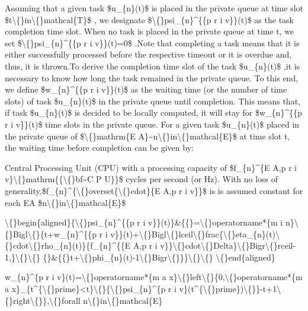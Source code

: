 \documentclass{article}
\begin{document}
Assuming that a given task \$u\_\{n\}(t)\$ is placed in the private queue at time slot \$t\textbackslash\{\}in\textbackslash\{\}mathcal\{T\}\$ , we designate \$\textbackslash\{\}psi\_\{n\}\textasciicircum{}\{\{p r i v\}\}(t)\$ as the task completion time slot. When no task is placed in the private queue at time t, we set \$\textbackslash\{\}psi\_\{n\}\textasciicircum{}\{\{p r i v\}\}(t)=0\$ .Note that completing a task means that it is either successfully processed before the respective timeout or it is overdue and, thus, it is thrown.To derive the completion time slot of the task \$u\_\{n\}(t)\$ ,it is necessary to know how long the task remained in the private queue. To this end, we define \$w\_\{n\}\textasciicircum{}\{\{p r i v\}\}(t)\$ as the waiting time (or the number of time slots) of task \$u\_\{n\}(t)\$ in the private queue until completion. This means that, if task \$u\_\{n\}(t)\$ is decided to be locally computed, it will stay for \$w\_\{n\}\textasciicircum{}\{\{p r i v\}\}(t)\$ time slots in the private queue. For a given task \$u\_\{n\}(t)\$ placed in the private queue of \$\textbackslash\{\}mathrm\{E A\}\textasciitilde{}n\textbackslash\{\}in\textbackslash\{\}mathcal\{E\}\$ at time slot t, the waiting time before completion can be given by:

Central Processing Unit (CPU) with a processing capacity of \$f\_\{n\}\textasciicircum{}\{E A,p r i v\}\textbackslash\{\}mathrm\{\{\textbackslash\{\}bf\textasciitilde{}C P U\}\}\$ cycles per second (or Hz). With no loss of generality,\$f\_\{n\}\textasciicircum{}\{\textbackslash\{\}overset\{\textbackslash\{\}cdot\}\{E A,p r i v\}\}\$ is is assumed constant for each EA 
\$n\textbackslash\{\}in\textbackslash\{\}mathcal\{E\}\$

\textbackslash\{\}begin\{aligned\}\{\textbackslash\{\}psi\_\{n\}\textasciicircum{}\{\{p r i v\}\}(t)\}\&\{\{\}=\textbackslash\{\}operatorname*\{m i n\}\textbackslash\{\}Bigl\textbackslash\{\}\{t+w\_\{n\}\textasciicircum{}\{\{p r i v\}\}(t)+\textbackslash\{\}Bigl\textbackslash\{\}lceil\textbackslash\{\}frac\{\textbackslash\{\}eta\_\{n\}(t)\textbackslash\{\}cdot\textbackslash\{\}rho\_\{n\}(t)\}\{f\_\{n\}\textasciicircum{}\{\{E A,p r i v\}\}\textbackslash\{\}cdot\textbackslash\{\}Delta\}\textbackslash\{\}Bigr\textbackslash\{\}rceil-1,\}\textbackslash\{\}\textbackslash\{\} \{\}\&\{\{\}t+\textbackslash\{\}phi\_\{n\}(t)-1\textbackslash\{\}Bigr\textbackslash\{\}\}\}\textbackslash\{\}\textbackslash\{\} \textbackslash\{\}end\{aligned\}

w\_\{n\}\textasciicircum{}\{p r i v\}(t)=\textbackslash\{\}operatorname*\{m a x\}\textbackslash\{\}left\textbackslash\{\}\{0,\textbackslash\{\}operatorname*\{m a x\}\_\{t\textasciicircum{}\{\textbackslash\{\}prime\}<t\}\textbackslash\{\}\{\textbackslash\{\}psi\_\{n\}\textasciicircum{}\{p r i v\}(t\textasciicircum{}\{\textbackslash\{\}prime\})\textbackslash\{\}\}-t+1\textbackslash\{\}right\textbackslash\{\}\},\textbackslash\{\}forall n\textbackslash\{\}in\textbackslash\{\}mathcal\{E\}
\end{document}
